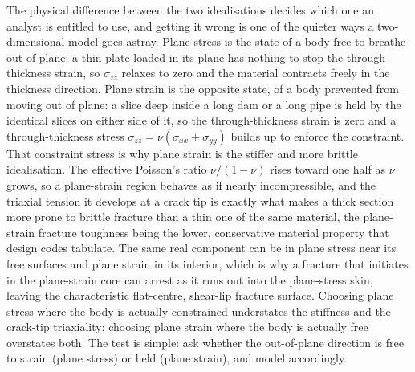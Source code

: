 The physical difference between the two idealisations decides which one an
analyst is entitled to use, and getting it wrong is one of the quieter ways
a two-dimensional model goes astray. Plane stress is the state of a body
free to breathe out of plane: a thin plate loaded in its plane has nothing
to stop the through-thickness strain, so $\sigma_{zz}$ relaxes to zero and
the material contracts freely in the thickness direction. Plane strain is
the opposite state, of a body prevented from moving out of plane: a slice
deep inside a long dam or a long pipe is held by the identical slices on
either side of it, so the through-thickness strain is zero and a
through-thickness stress $\sigma_{zz} = \nu(\sigma_{xx}+\sigma_{yy})$ builds
up to enforce the constraint. That constraint stress is why plane strain is
the stiffer and more brittle idealisation. The effective Poisson's ratio
$\nu/(1-\nu)$ rises toward one half as $\nu$ grows, so a plane-strain region
behaves as if nearly incompressible, and the triaxial tension it develops at
a crack tip is exactly what makes a thick section more prone to brittle
fracture than a thin one of the same material, the plane-strain fracture
toughness being the lower, conservative material property that design codes
tabulate. The same real component can be in plane stress near its free
surfaces and plane strain in its interior, which is why a fracture that
initiates in the plane-strain core can arrest as it runs out into the
plane-stress skin, leaving the characteristic flat-centre, shear-lip
fracture surface. Choosing plane stress where the body is actually
constrained understates the stiffness and the crack-tip triaxiality;
choosing plane strain where the body is actually free overstates both. The
test is simple: ask whether the out-of-plane direction is free to strain
(plane stress) or held (plane strain), and model accordingly.

